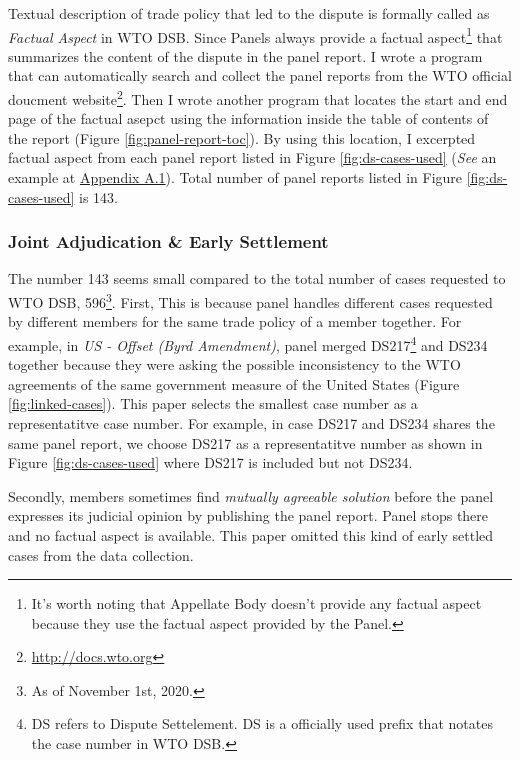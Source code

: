 Textual description of trade policy that 
led to the dispute is formally called as
\textit{Factual Aspect} in WTO DSB. 
Since Panels
always provide a factual aspect\footnote{
    It's worth noting that Appellate Body doesn't provide any factual aspect because they use the factual aspect provided by the Panel.
}
that summarizes the content of the dispute
in the panel report. %
I wrote a program that can 
automatically search and collect 
the panel reports from the WTO official doucment website\footnote{
    \url{http://docs.wto.org}
}.
Then I wrote another program that locates the start 
and end page of the factual asepct using the information inside the 
table of contents of the report (Figure \ref{fig:panel-report-toc}).
By using this location, I excerpted factual aspect
from each panel report listed in Figure \ref{fig:ds-cases-used} (\textit{See} an example at \hyperref[sub:factual-aspect-example]{Appendix A.1}). Total number of panel reports listed in Figure \ref{fig:ds-cases-used} is 143.

\subsubsection{Joint Adjudication \& Early Settlement}

The number 143 seems small compared to the total number of cases requested to WTO DSB, 596\footnote
{
    As of November 1st, 2020.
}. First, This is because panel handles different cases requested by different members
for the same trade policy of a member together. For example, in \textit{US - Offset (Byrd Amendment)}, panel merged DS217\footnote{
    DS refers to Dispute Settelement. DS is a officially used prefix that notates the case number in WTO DSB.
} and DS234 together because they were asking the possible inconsistency to the WTO agreements 
of the same government measure of the United States (Figure \ref{fig:linked-cases}). 
This paper selects the smallest case number as a representatitve case number. 
For example, in case DS217 and DS234 shares the same panel report, we choose DS217 as a representatitve number as shown in Figure \ref{fig:ds-cases-used} where DS217 is included but not DS234.

Secondly, members sometimes find \textit{mutually agreeable solution} before the panel expresses its judicial opinion by publishing the panel report. Panel stops there and no factual aspect is available. This paper omitted this kind of early settled cases from the data collection.

